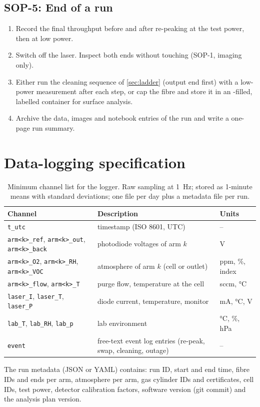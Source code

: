 \subsection*{SOP-5: End of a run}
\begin{enumerate}
  \item Record the final throughput before and after re-peaking at the test power, then at low power.
  \item Switch off the laser. Inspect both ends without touching (SOP-1, imaging only).
  \item Either run the cleaning sequence of \cref{sec:ladder} (output end first) with a low-power
        measurement after each step, or cap the fibre and store it in an \Ntwo-filled, labelled container
        for surface analysis.
  \item Archive the data, images and notebook entries of the run and write a one-page run summary.
\end{enumerate}

\section{Data-logging specification}\label{app:logging}
\begin{table}[htbp]
\centering\small
\caption{Minimum channel list for the logger. Raw sampling at \SI{1}{Hz}; stored as 1-minute means
with standard deviations; one file per day plus a metadata file per run.}
\label{tab:channels}
\begin{tabularx}{\textwidth}{@{}l Y l@{}}
\toprule
Channel & Description & Units \\
\midrule
\texttt{t\_utc} & timestamp (ISO 8601, UTC) & -- \\
\texttt{arm<k>\_ref}, \texttt{arm<k>\_out}, \texttt{arm<k>\_back} & photodiode voltages of arm $k$ & V \\
\texttt{arm<k>\_O2}, \texttt{arm<k>\_RH}, \texttt{arm<k>\_VOC} & atmosphere of arm $k$ (cell or outlet) & ppm, \%, index \\
\texttt{arm<k>\_flow}, \texttt{arm<k>\_T} & purge flow, temperature at the cell & sccm, \si{\celsius} \\
\texttt{laser\_I}, \texttt{laser\_T}, \texttt{laser\_P} & diode current, temperature, monitor & mA, \si{\celsius}, V \\
\texttt{lab\_T}, \texttt{lab\_RH}, \texttt{lab\_p} & lab environment & \si{\celsius}, \%, hPa \\
\texttt{event} & free-text event log entries (re-peak, swap, cleaning, outage) & -- \\
\bottomrule
\end{tabularx}
\end{table}
The run metadata (JSON or YAML) contains: run ID, start and end time, fibre IDs and ends per arm,
atmosphere per arm, gas cylinder IDs and certificates, cell IDs, test power, detector calibration
factors, software version (git commit) and the analysis plan version.

